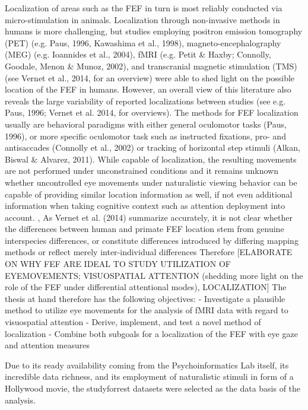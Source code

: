 \documentclass[a4paper, 12pt]{scrreprt}
\begin{document}
Localization of areas such as the FEF in turn is most reliably conducted via micro-stimulation in animals. Localization through non-invasive methods in humans is more challenging, but studies employing positron emission tomography (PET) (e.g. Paus, 1996, Kawashima et al., 1998), magneto-encephalography (MEG) (e.g. Ioannides et al., 2004), fMRI (e.g. Petit \& Haxby; Connolly, Goodale, Menon \& Munoz, 2002), and transcranial magnetic stimulation (TMS) (see Vernet et al., 2014, for an overview) were able to shed light on the possible location of the FEF in humans.  However, an overall view of this literature also reveals the large variability of reported localizations between studies (see e.g. Paus, 1996; Vernet et al. 2014, for overviews). The methods for FEF localization usually are behavioral paradigms with either general oculomotor tasks (Paus, 1996), or more specific oculomotor task such as instructed fixations, pro- and antisaccades (Connolly et al., 2002) or tracking of horizontal step stimuli (Alkan, Biswal \& Alvarez, 2011). While capable of localization, the resulting movements are not performed under unconstrained conditions and it remains unknown whether uncontrolled eye movements under naturalistic viewing behavior can be capable of providing similar location information as well, if not even additional information when taking cognitive context such as attention deployment into account.\newline
, As Vernet et al. (2014) summarize accurately, it is not clear whether the differences between human and primate FEF location stem from genuine interspecies differences, or constitute differences introduced by differing mapping methods or reflect merely inter-individual differences
Therefore [ELABORATE ON WHY FEF ARE IDEAL TO STUDY UTILIZATION OF EYEMOVEMENTS; VISUOSPATIAL ATTENTION (shedding more light on the role of the FEF under differential attentional modes), LOCALIZATION]
The thesis at hand therefore has the following objectives:
- Investigate a plausible method to utilize eye movements for the analysis of fMRI data with regard to visuospatial attention
- Derive, implement, and test a novel method of localization
- Combine both subgoals for a localization of the FEF with eye gaze and attention measures

Due to its ready availability coming from the Psychoinformatics Lab itself, its incredible data richness, and its employment of naturalistic stimuli in form of a Hollywood movie, the studyforrest datasets were selected as the data basis of the analysis.
\end{document}
